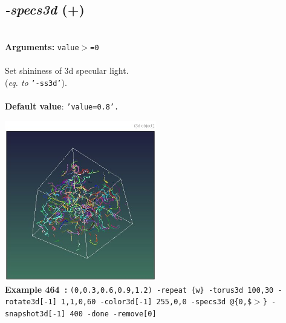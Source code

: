 \documentclass[a4paper,11pt,twoside]{book}
\begin{document}
\subsection{\emph{-specs3d} (+)}\vspace*{-0.5em}
~\\\textbf{Arguments: } 
{\small \texttt{value$>$=0}}\\~\\
Set shininess of 3d specular light.
~\\(\emph{eq. to} {\small \texttt{'-ss3d'}}).
~\\~\\\textbf{Default value}: {\small \texttt{'value=0.8'.}}
\begin{center}\includegraphics[keepaspectratio=true,height=7cm,width=\textwidth]{img/gmic_def464.jpg}\\
{\footnotesize \textbf{Example 464~:} \texttt{(0,0.3,0.6,0.9,1.2) -repeat \{w\} -torus3d 100,30 -rotate3d[-1] 1,1,0,60 -color3d[-1] 255,0,0 -specs3d @\{0,\$$>$\} -snapshot3d[-1] 400 -done -remove[0]}}
\end{center}
\end{document}
